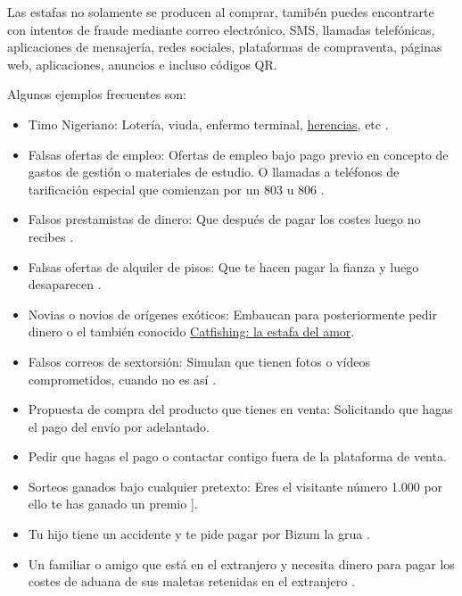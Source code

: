\documentclass[
  spanish,
  a4paper,
  openany]{book}
\begin{document}
Las estafas no solamente se producen al comprar, tamibén puedes encontrarte con intentos de fraude mediante correo electrónico, SMS, llamadas telefónicas, aplicaciones de mensajería, redes sociales, plataformas de compraventa, páginas web, aplicaciones, anuncios e incluso códigos QR.

Algunos ejemplos frecuentes son:

\begin{itemize}
\item
  Timo Nigeriano: Lotería, viuda, enfermo terminal, \href{https://www.incibe.es/ciudadania/blog/sabias-que-el-95-de-las-incidencias-en-ciberseguridad-se-deben-errores}{herencias}, etc \citep{WIKI-timo-nigeriano}.
\item
  Falsas ofertas de empleo: Ofertas de empleo bajo pago previo en concepto de gastos de gestión o materiales de estudio. O llamadas a teléfonos de tarificación especial que comienzan por un 803 u 806 \citep{INCI-falsas-ofertas-empleo}.
\item
  Falsos prestamistas de dinero: Que después de pagar los costes luego no recibes \citep{INCI-falsos-prestamos}.
\item
  Falsas ofertas de alquiler de pisos: Que te hacen pagar la fianza y luego desaparecen \citep{INCI-falsos-alquileres}.
\item
  Novias o novios de orígenes exóticos: Embaucan para posteriormente pedir dinero \citep{INCI-novias-exoticas} o el también conocido \href{https://www.incibe.es/ciudadania/blog/catfishing-la-estafa-del-amor}{Catfishing: la estafa del amor}.
\item
  Falsos correos de sextorsión: Simulan que tienen fotos o vídeos comprometidos, cuando no es así \citep{INCI-correos-sextorsion}.
\item
  Propuesta de compra del producto que tienes en venta: Solicitando que hagas el pago del envío por adelantado.
\item
  Pedir que hagas el pago o contactar contigo fuera de la plataforma de venta.
\item
  Sorteos ganados bajo cualquier pretexto: Eres el visitante número 1.000 por ello te has ganado un premio \citep{INCI-ganador-sorteo}{]}.
\item
  Tu hijo tiene un accidente y te pide pagar por Bizum la grua \citep{INCI-bizum}.
\item
  Un familiar o amigo que está en el extranjero y necesita dinero para pagar los costes de aduana de sus maletas retenidas en el extranjero \citep{INCI-whatsapp-fraude-familiar}.

\end{itemize}
\end{document}
